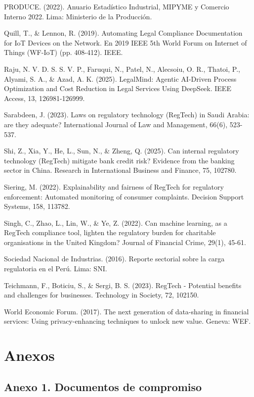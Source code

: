 \documentclass[12pt,a4paper,oneside]{report}
\begin{document}
PRODUCE. (2022). Anuario Estadístico Industrial, MIPYME y Comercio
Interno 2022. Lima: Ministerio de la Producción.

Quill, T., \& Lennon, R. (2019). Automating Legal Compliance
Documentation for IoT Devices on the Network. En 2019 IEEE 5th World
Forum on Internet of Things (WF-IoT) (pp. 408-412). IEEE.

Raju, N. V. D. S. S. V. P., Faruqui, N., Patel, N., Alecsoiu, O. R.,
Thatoi, P., Alyami, S. A., \& Azad, A. K. (2025). LegalMind: Agentic
AI-Driven Process Optimization and Cost Reduction in Legal Services
Using DeepSeek. IEEE Access, 13, 126981-126999.

Sarabdeen, J. (2023). Laws on regulatory technology (RegTech) in Saudi
Arabia: are they adequate? International Journal of Law and Management,
66(6), 523-537.

Shi, Z., Xia, Y., He, L., Sun, N., \& Zheng, Q. (2025). Can internal
regulatory technology (RegTech) mitigate bank credit risk? Evidence from
the banking sector in China. Research in International Business and
Finance, 75, 102780.

Siering, M. (2022). Explainability and fairness of RegTech for
regulatory enforcement: Automated monitoring of consumer complaints.
Decision Support Systems, 158, 113782.

Singh, C., Zhao, L., Lin, W., \& Ye, Z. (2022). Can machine learning, as
a RegTech compliance tool, lighten the regulatory burden for charitable
organisations in the United Kingdom? Journal of Financial Crime, 29(1),
45-61.

Sociedad Nacional de Industrias. (2016). Reporte sectorial sobre la
carga regulatoria en el Perú. Lima: SNI.

Teichmann, F., Boticiu, S., \& Sergi, B. S. (2023). RegTech - Potential
benefits and challenges for businesses. Technology in Society, 72,
102150.

World Economic Forum. (2017). The next generation of data-sharing in
financial services: Using privacy-enhancing techniques to unlock new
value. Geneva: WEF.

\section{Anexos}\label{anexos}

\subsection{Anexo 1. Documentos de
compromiso}\label{anexo-1.-documentos-de-compromiso}
\end{document}

